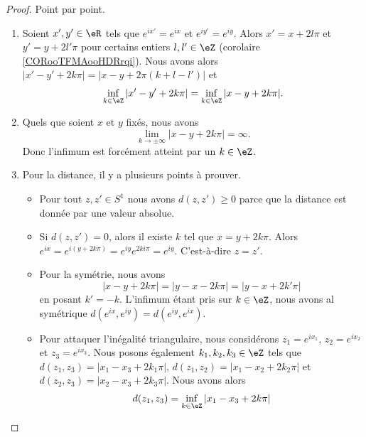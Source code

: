 \begin{proof}
	Point par point.
	\begin{enumerate}
		\item
		      Soient \( x',y'\in \eR\) tels que \(  e^{ix'}= e^{ix}\) et \(  e^{iy'}= e^{iy}\). Alors \( x'=x+2l\pi\) et \( y'=y+2l'\pi\) pour certains entiers \( l,l'\in \eZ\) (corolaire \ref{CORooTFMAooHDRrqi}). Nous avons alors \( | x'-y'+2k\pi |=| x-y+2\pi(k+l-l') |\) et
		      \begin{equation}
			      \inf_{k\in \eZ}| x'-y'+2k\pi |=\inf_{k\in \eZ}| x-y+2k\pi |.
		      \end{equation}
		\item
		      Quels que soient \( x\) et \( y\) fixés, nous avons
		      \begin{equation}
			      \lim_{k\to \pm\infty} | x-y+2k\pi |=\infty.
		      \end{equation}
		      Donc l'infimum est forcément atteint par un \( k\in \eZ\).
		\item
		      Pour la distance, il y a plusieurs points à prouver.
		      \begin{itemize}
			      \item
			            Pour tout \( z,z'\in S^1\) nous avons \( d(z,z')\geq 0\) parce que la distance est donnée par une valeur absolue.
			      \item
			            Si \( d(z,z')=0\), alors il existe \( k\) tel que \( x=y+2k\pi\). Alors \(  e^{ix}= e^{i(y+2k\pi)}= e^{iy} e^{2ki\pi}= e^{iy}\). C'est-à-dire \( z=z'\).
			      \item
			            Pour la symétrie, nous avons
			            \begin{equation}
				            | x-y+2k\pi |=| y-x-2k\pi |=| y-x+2k'\pi |
			            \end{equation}
			            en posant \( k'=-k\). L'infimum étant pris sur \( k\in \eZ\), nous avons al symétrique \( d( e^{ix},  e^{iy})=d( e^{iy}, e^{ix})\).
			      \item
			            Pour attaquer l'inégalité triangulaire, nous considérons \( z_1= e^{ix_1}\), \( z_2= e^{ix_2}\) et \( z_3= e^{ix_3}\). Nous posons également \( k_1,k_2, k_3\in \eZ\) tels que \( d(z_1,z_3)=| x_1-x_3+2k_1\pi | \), \( d(z_1,z_2)=| x_1-x_2+2k_2\pi |\) et \( d(z_2,z_3)=| x_2-x_3+2k_3\pi |\). Nous avons alors
			            \begin{subequations}
				            \begin{align}
					            d(z_1,z_3) & =\inf_{k\in \eZ}| x_1-x_3+2k\pi |                                                                \\

\end{align}
\end{subequations}
\end{itemize}
\end{enumerate}
\end{proof}
